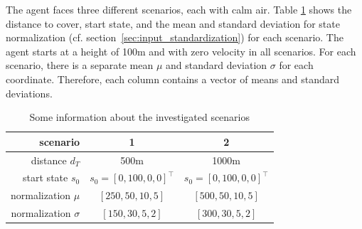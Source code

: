 The agent faces three different scenarios, each with calm air. Table \ref{tab:scenario_data} shows the distance to cover, start state, and the mean and standard deviation for state normalization (cf. section~\ref{sec:input_standardization}) for each scenario. The agent starts at a height of 100m and with zero velocity in all scenarios. For each scenario, there is a separate mean $\mu$ and standard deviation $\sigma$ for each coordinate. Therefore, each column contains a vector of means and standard deviations.

\begin{table}[h]
	\begin{center}
		\begin{tabular}{r|c c}
			scenario & 1 & 2 \\ \hline
			distance $d_T$ & 500m & 1000m \\
			start state $s_0$ & $s_0 = [0, 100, 0, 0]^\top$ &  $s_0 = [0, 100, 0, 0]^\top$ \\
			normalization $\mu$ & $[250, 50, 10, 5]$  &$[500, 50, 10, 5]$ \\
			normalization $\sigma$ & $[150, 30, 5, 2]$ & $[300, 30, 5, 2]$
		\end{tabular}
		\caption{Some information about the investigated scenarios}
		\label{tab:scenario_data}
	\end{center}
\end{table}
%

